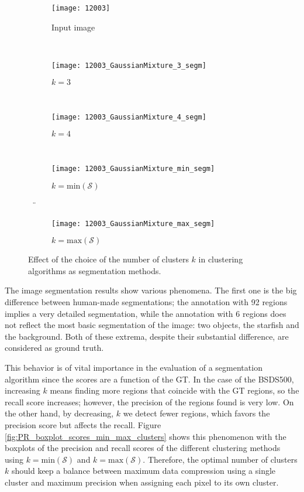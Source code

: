 \begin{figure}[!ht]
    
    \begin{subfigure}[b]{0.23\textwidth}
        \texttt{[image: 12003]}
        \caption{Input image}
    \end{subfigure} \\  \vspace{5pt}
    
    \begin{subfigure}[b]{0.23\textwidth}
    	\centering
    	\texttt{[image: 12003\_GaussianMixture\_3\_segm]}
        \caption{$k=3$ }
    \end{subfigure} ~
    \begin{subfigure}[b]{0.23\textwidth}
    	\centering
        \texttt{[image: 12003\_GaussianMixture\_4\_segm]}
        \caption{$k=4$}
    \end{subfigure} ~
    \begin{subfigure}[b]{0.23\textwidth}
    	\centering
    	\texttt{[image: 12003\_GaussianMixture\_min\_segm]}
        \caption{$k=\mathrm{min}(\mathcal{S})$}
    \end{subfigure} ~¨
    \begin{subfigure}[b]{0.23\textwidth}
    	\centering
    	\texttt{[image: 12003\_GaussianMixture\_max\_segm]}
        \caption{$k=\mathrm{max}(\mathcal{S})$}
    \end{subfigure} 
        	    
    \caption{Effect of the choice of the number of clusters $k$ in clustering algorithms as segmentation methods.}\label{fig:Gmixture_starfish_segms_diff_k}    
\end{figure}

The image segmentation results show various phenomena. The first one is the big difference between human-made segmentations; the annotation with 92 regions implies a very detailed segmentation, while the annotation with 6 regions does not reflect the most basic segmentation of the image: two objects, the starfish and the background. Both of these extrema, despite their substantial difference, are considered as ground truth.

This behavior is of vital importance in the evaluation of a segmentation algorithm since the scores are a function of the GT. In the case of the BSDS500, increasing $k$ means finding more regions that coincide with the GT regions, so the recall score increases; however, the precision of the regions found is very low. On the other hand, by decreasing, $k$ we detect fewer regions, which favors the precision score but affects the recall. Figure \ref{fig:PR_boxplot_scores_min_max_clusters} shows this phenomenon with the boxplots of the precision and recall scores of the different clustering methods using $k = \mathrm{min}(\mathcal{S})$ and $k = \mathrm{max}(\mathcal{S})$. Therefore, the optimal number of clusters $k$ should keep a balance between maximum data compression using a single cluster and maximum precision when assigning each pixel to its own cluster.


